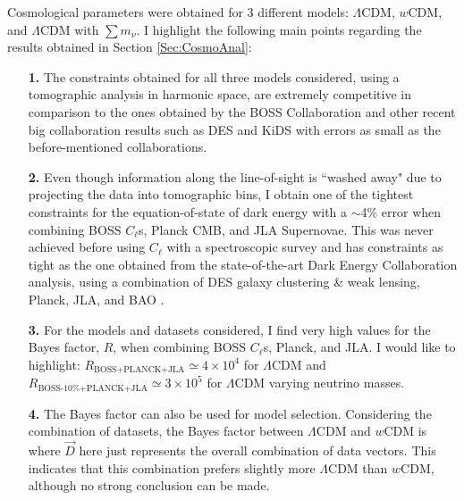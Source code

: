 \qquad Cosmological parameters were obtained for 3 different models: $\Lambda$CDM, $w$CDM, and $\Lambda$CDM with $\sum m_{\nu}$. I highlight the following main points regarding the results obtained in Section \ref{Sec:CosmoAnal}:
\begin{itemize}
\item[\textbf{1.}] The constraints obtained for all three models considered, using a tomographic analysis in harmonic space, are extremely competitive in comparison to the ones obtained by the BOSS Collaboration \citep{2016BOSSCosmology} and other recent big collaboration results such as DES \citep{2017arXiv170801530D} and KiDS \citep{2017MNRAS.465.1454H} with errors as small as the before-mentioned collaborations.

\item[\textbf{2.}] Even though information along the line-of-sight is ``washed away" due to projecting the data into tomographic bins, I obtain one of the tightest constraints for the  equation-of-state of dark energy with a $\sim$4\% error when combining BOSS $C_{\ell}$s, Planck CMB, and JLA Supernovae. This was never achieved before using $C_{\ell}$ with a spectroscopic survey and has constraints as tight as the one obtained from the state-of-the-art Dark Energy Collaboration analysis, using a combination of DES galaxy clustering \& weak lensing, Planck, JLA, and BAO \citep{2017arXiv170801530D}.

\item[\textbf{3.}] For the models and datasets considered, I find very high values for the Bayes factor, $R$, when combining BOSS $C_{\ell}$s, Planck, and JLA. I would like to highlight: $R_{\scriptscriptstyle\text{BOSS+PLANCK+JLA}} \simeq 4 \times 10^4$ for $\Lambda$CDM and $R_{\scriptscriptstyle\text{BOSS-10\%+PLANCK+JLA}} \simeq 3 \times 10^5$ for $\Lambda$CDM varying neutrino masses. 

\item[\textbf{4.}] The Bayes factor can also be used for model selection. Considering the combination of datasets, the Bayes factor between $\Lambda$CDM and $w$CDM is
where $\vec{D}$ here just represents the overall combination of data vectors. This indicates that this combination prefers slightly more $\Lambda$CDM than $w$CDM, although no strong conclusion can be made. 


\end{itemize}
